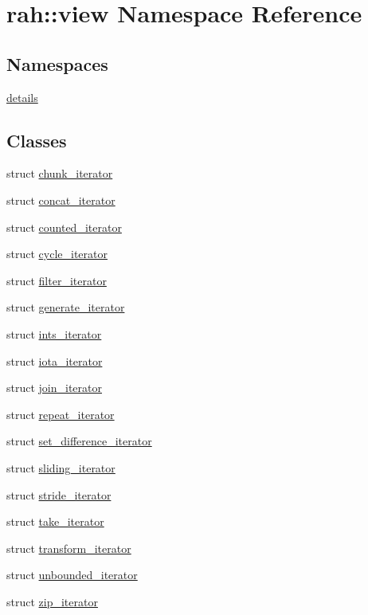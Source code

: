 \hypertarget{namespacerah_1_1view}{}\section{rah\+::view Namespace Reference}
\label{namespacerah_1_1view}
\subsection*{Namespaces}
\begin{DoxyCompactItemize}
\item 
 \mbox{\hyperlink{namespacerah_1_1view_1_1details}{details}}
\end{DoxyCompactItemize}
\subsection*{Classes}
\begin{DoxyCompactItemize}
\item 
struct \mbox{\hyperlink{structrah_1_1view_1_1chunk__iterator}{chunk\+\_\+iterator}}
\item 
struct \mbox{\hyperlink{structrah_1_1view_1_1concat__iterator}{concat\+\_\+iterator}}
\item 
struct \mbox{\hyperlink{structrah_1_1view_1_1counted__iterator}{counted\+\_\+iterator}}
\item 
struct \mbox{\hyperlink{structrah_1_1view_1_1cycle__iterator}{cycle\+\_\+iterator}}
\item 
struct \mbox{\hyperlink{structrah_1_1view_1_1filter__iterator}{filter\+\_\+iterator}}
\item 
struct \mbox{\hyperlink{structrah_1_1view_1_1generate__iterator}{generate\+\_\+iterator}}
\item 
struct \mbox{\hyperlink{structrah_1_1view_1_1ints__iterator}{ints\+\_\+iterator}}
\item 
struct \mbox{\hyperlink{structrah_1_1view_1_1iota__iterator}{iota\+\_\+iterator}}
\item 
struct \mbox{\hyperlink{structrah_1_1view_1_1join__iterator}{join\+\_\+iterator}}
\item 
struct \mbox{\hyperlink{structrah_1_1view_1_1repeat__iterator}{repeat\+\_\+iterator}}
\item 
struct \mbox{\hyperlink{structrah_1_1view_1_1set__difference__iterator}{set\+\_\+difference\+\_\+iterator}}
\item 
struct \mbox{\hyperlink{structrah_1_1view_1_1sliding__iterator}{sliding\+\_\+iterator}}
\item 
struct \mbox{\hyperlink{structrah_1_1view_1_1stride__iterator}{stride\+\_\+iterator}}
\item 
struct \mbox{\hyperlink{structrah_1_1view_1_1take__iterator}{take\+\_\+iterator}}
\item 
struct \mbox{\hyperlink{structrah_1_1view_1_1transform__iterator}{transform\+\_\+iterator}}
\item 
struct \mbox{\hyperlink{structrah_1_1view_1_1unbounded__iterator}{unbounded\+\_\+iterator}}
\item 
struct \mbox{\hyperlink{structrah_1_1view_1_1zip__iterator}{zip\+\_\+iterator}}
\end{DoxyCompactItemize}

